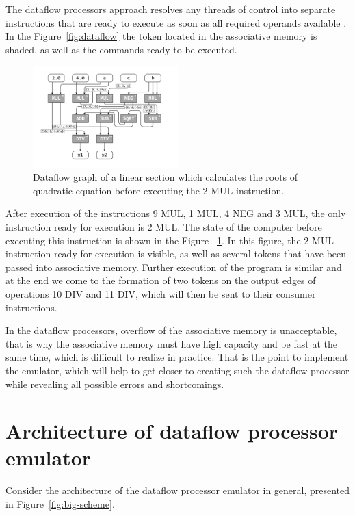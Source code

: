 \documentclass[
11pt,%
tightenlines,%
twoside,%
onecolumn,%
nofloats,%
nobibnotes,%
nofootinbib,%
superscriptaddress,%
noshowpacs,%
centertags]%
{revtex4}
\begin{document}
The dataflow processors approach resolves any threads of control into separate instructions that are ready to execute as soon as all required operands available \cite{silc}.
In the Figure~\ref{fig:dataflow} the token located in the associative memory is shaded, as well as the commands ready to be executed.

\begin{figure}[h]
\setcaptionmargin{5mm} %
\includegraphics[width=0.50\textwidth]{pics/dataflow2.pdf}
\caption{Dataflow graph of a linear section which calculates the roots of quadratic equation before executing the 2 MUL instruction.}\label{fig:dataflow2}
\end{figure}

After execution of the instructions 9 MUL, 1 MUL, 4 NEG and 3 MUL,
the only instruction ready for execution is 2 MUL. The state of the
computer before executing this instruction is shown in the Figure
~\ref{fig:dataflow2}. In this figure, the 2 MUL instruction ready
for execution is visible, as well as several tokens that have been
passed into associative memory. Further execution of the program is
similar and at the end we come to the formation of two tokens on the
output edges of operations 10 DIV and 11 DIV, which will then be
sent to their consumer instructions.

In the dataflow processors, overflow of the associative memory is unacceptable, that is why the associative memory must have high capacity and be fast at the same time, which is difficult to realize in practice.
That is the point to implement the emulator, which will help to get closer to creating such the dataflow processor while revealing all possible errors and shortcomings.

\section{Architecture of dataflow processor emulator}

Consider the architecture of the dataflow processor emulator in general, presented in Figure~\ref{fig:big-scheme}.
\end{document}
